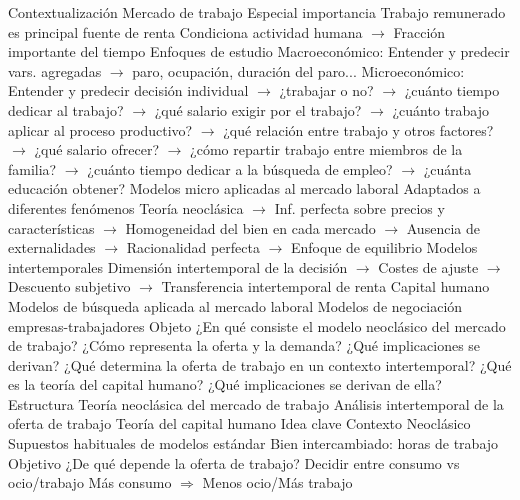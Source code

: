 \documentclass{nuevotema}
\begin{document}
\begin{esquema}[enumerate]
\end{esquema}

\esquemalargo

\begin{esquemal}
	\1[] 
		\2 Contextualización
			\3 Mercado de trabajo
				\4 Especial importancia
				\4[] Trabajo remunerado es principal fuente de renta
				\4[] Condiciona actividad humana
				\4[] $\to$ Fracción importante del tiempo
			\3 Enfoques de estudio
				\4 Macroeconómico:
				\4[] Entender y predecir vars. agregadas
				\4[] $\to$ paro, ocupación, duración del paro...
				\4 Microeconómico:
				\4[] Entender y predecir decisión individual
				\4[] $\to$ ¿trabajar o no?
				\4[] $\to$ ¿cuánto tiempo dedicar al trabajo?
				\4[] $\to$ ¿qué salario exigir por el trabajo?
				\4[] $\to$ ¿cuánto trabajo aplicar al proceso productivo?
				\4[] $\to$ ¿qué relación entre trabajo y otros factores?
				\4[] $\to$ ¿qué salario ofrecer?
				\4[] $\to$ ¿cómo repartir trabajo entre miembros de la familia?
				\4[] $\to$ ¿cuánto tiempo dedicar a la búsqueda de empleo?
				\4[] $\to$ ¿cuánta educación obtener?
			\3 Modelos micro aplicadas al mercado laboral
				\4 Adaptados a diferentes fenómenos
				\4 Teoría neoclásica
				\4[] $\to$ Inf. perfecta sobre precios y características
				\4[] $\to$ Homogeneidad del bien en cada mercado
				\4[] $\to$ Ausencia de externalidades
				\4[] $\to$ Racionalidad perfecta
				\4[] $\to$ Enfoque de equilibrio
				\4 Modelos intertemporales
				\4[] Dimensión intertemporal de la decisión
				\4[] $\to$ Costes de ajuste
				\4[] $\to$ Descuento subjetivo
				\4[] $\to$ Transferencia intertemporal de renta
				\4 Capital humano
				\4 Modelos de búsqueda aplicada al mercado laboral
				\4 Modelos de negociación empresas-trabajadores
		\2 Objeto
			\3 ¿En qué consiste el modelo neoclásico del mercado de trabajo?
			\3 ¿Cómo representa la oferta y la demanda?
			\3 ¿Qué implicaciones se derivan?
			\3 ¿Qué determina la oferta de trabajo en un contexto intertemporal?
			\3 ¿Qué es la teoría del capital humano?
			\3 ¿Qué implicaciones se derivan de ella?
		\2 Estructura
			\3 Teoría neoclásica del mercado de trabajo
			\3 Análisis intertemporal de la oferta de trabajo
			\3 Teoría del capital humano
	\1 
		\2 Idea clave
			\3 Contexto
				\4 Neoclásico
				\4 Supuestos habituales de modelos estándar
				\4 Bien intercambiado: horas de trabajo
			\3 Objetivo
				\4 ¿De qué depende la oferta de trabajo?
				\4[] Decidir entre consumo vs ocio/trabajo
				\4[] Más consumo $\Rightarrow$ Menos ocio/Más trabajo

\end{esquemal}
\end{document}
